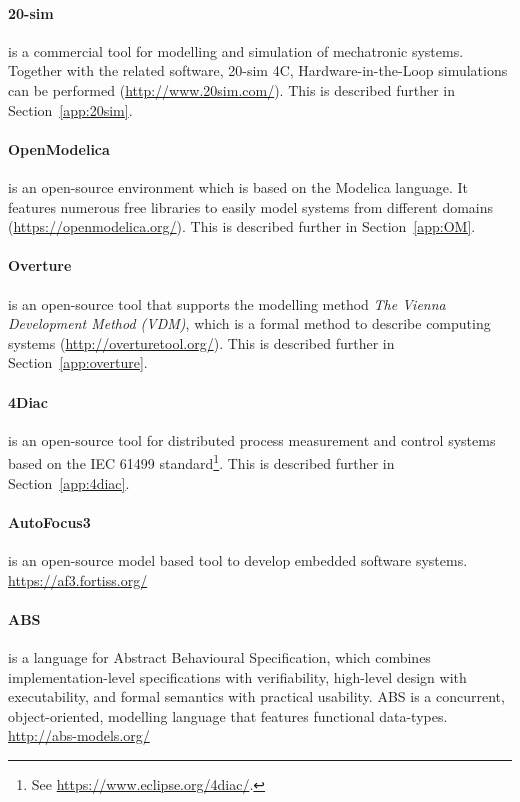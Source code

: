 \paragraph{20-sim} is a commercial tool for modelling and simulation of mechatronic systems. Together with the related software, 20-sim 4C, Hardware-in-the-Loop simulations can be performed (\url{http://www.20sim.com/}). This is described further in Section~\ref{app:20sim}.

\paragraph{OpenModelica} is an open-source environment which is based on the Modelica language. It features numerous free libraries to easily model systems from different domains (\url{https://openmodelica.org/}). This is described further in Section~\ref{app:OM}.

\paragraph{Overture} is an open-source tool that supports the modelling method \textit{The Vienna Development Method (VDM)}, which is a formal method to describe computing systems (\url{http://overturetool.org/}). This is described further in Section~\ref{app:overture}.

\paragraph{4Diac} is an open-source tool for distributed process measurement and control systems based on the IEC 61499 standard\footnote{See \url{https://www.eclipse.org/4diac/}.}. This is described further in Section~\ref{app:4diac}.

\paragraph{AutoFocus3} is an open-source model based tool to develop embedded software systems. \url{https://af3.fortiss.org/}


\paragraph{ABS} is a language for Abstract Behavioural Specification, which combines implementation-level specifications with verifiability, high-level design with executability, and formal semantics with practical usability. ABS is a concurrent, object-oriented, modelling language that features functional data-types. \url{http://abs-models.org/}

